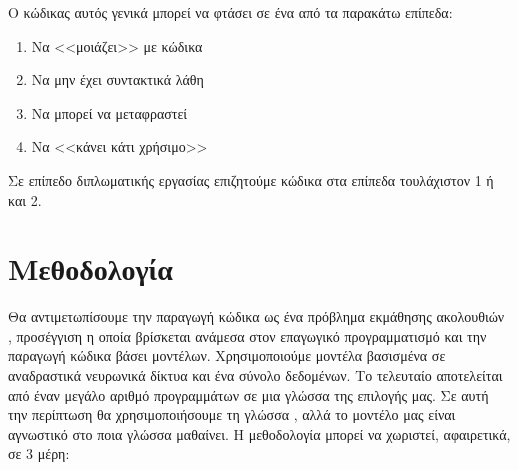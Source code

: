 Ο κώδικας αυτός γενικά μπορεί να φτάσει σε ένα από τα παρακάτω επίπεδα:

\begin{enumerate}
\item Να <<μοιάζει>> με κώδικα
\item Να μην έχει συντακτικά λάθη
\item Να μπορεί να μεταφραστεί
\item Να <<κάνει κάτι χρήσιμο>>
\end{enumerate}

Σε επίπεδο διπλωματικής εργασίας επιζητούμε κώδικα στα επίπεδα τουλάχιστον 1 ή και 2.

\section{Μεθοδολογία}
Θα αντιμετωπίσουμε την παραγωγή κώδικα ως ένα πρόβλημα εκμάθησης ακολουθιών , προσέγγιση η οποία βρίσκεται ανάμεσα στον επαγωγικό προγραμματισμό και την παραγωγή κώδικα βάσει μοντέλων.
Χρησιμοποιούμε μοντέλα βασισμένα σε αναδραστικά νευρωνικά δίκτυα και ένα σύνολο δεδομένων. 
Το τελευταίο αποτελείται από έναν μεγάλο αριθμό προγραμμάτων σε μια γλώσσα της επιλογής μας. Σε αυτή την περίπτωση θα χρησιμοποιήσουμε τη γλώσσα , αλλά το μοντέλο μας είναι αγνωστικό στο ποια γλώσσα μαθαίνει.
Η μεθοδολογία μπορεί να χωριστεί, αφαιρετικά, σε 3 μέρη:

